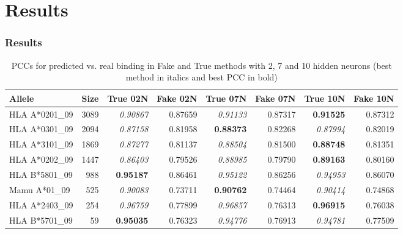 \documentclass[10pt,presentation]{beamer}
\begin{document}
\section{Results}
\begin{frame}
  \frametitle{Results}
\begin{table}[htb]
   \tiny
   \centering
  \caption{PCCs for predicted vs. real binding in Fake and True methods with 2, 7 and 10 hidden neurons (best method in italics and best PCC in bold) }
\label{tab:results}
  \begin{tabular}{l|r||r|r||r|r||r|r}
    \hline
      \textbf{Allele} & \textbf{Size} & \textbf{True 02N} & \textbf{Fake 02N} & \textbf{True 07N} & \textbf{Fake 07N} & \textbf{True 10N} & \textbf{Fake 10N} \\\hline \hline
      HLA A*0201\_09 & 3089 & \textit{0.90867} & 0.87659 & \textit{0.91133} & 0.87317 & \textbf{0.91525} & 0.87312 \\\hline
      HLA A*0301\_09 & 2094 & \textit{0.87158} & 0.81958 & \textbf{0.88373} & 0.82268 & \textit{0.87994} & 0.82019 \\\hline
      HLA A*3101\_09 & 1869 & \textit{0.87277} & 0.81137 & \textit{0.88504} & 0.81500 & \textbf{0.88748} & 0.81351 \\\hline
      HLA A*0202\_09 & 1447 & \textit{0.86403} & 0.79526 & \textit{0.88985} & 0.79790 & \textbf{0.89163} & 0.80160 \\\hline
      HLA B*5801\_09 &  988 & \textbf{0.95187} & 0.86461 & \textit{0.95122} & 0.86256 & \textit{0.94953} & 0.86070 \\\hline
      Mamu A*01\_09  &  525 & \textit{0.90083} & 0.73711 & \textbf{0.90762} & 0.74464 & \textit{0.90414} & 0.74868 \\\hline
      HLA A*2403\_09 &  254 & \textit{0.96759} & 0.77899 & \textit{0.96857} & 0.76313 & \textbf{0.96915} & 0.76038 \\\hline
      HLA B*5701\_09 &   59 & \textbf{0.95035} & 0.76323 & \textit{0.94776} & 0.76913 & \textit{0.94781} & 0.77509 \\\hline
   \end{tabular}
\end{table}

\end{frame}
\end{document}
